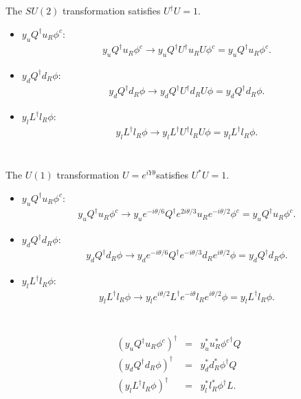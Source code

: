 \documentclass[11pt]{article}
\begin{document}
\section{ }
The $SU(2)$ transformation satisfies $U^\dagger U=1$.
\begin{itemize}
  \item $y_u Q^\dagger u_R \phi^c$:
  \begin{eqnarray}
    y_u Q^\dagger u_R \phi^c \to y_u Q^\dagger U^\dagger u_R U \phi^c = y_u Q^\dagger u_R \phi^c.
  \end{eqnarray}
  \item $y_d Q^\dagger d_R \phi$:
  \begin{eqnarray}
    y_d Q^\dagger d_R \phi \to y_d Q^\dagger U^\dagger d_R U \phi = y_d Q^\dagger d_R \phi.
  \end{eqnarray}
  \item $y_l L^\dagger l_R \phi$:
  \begin{eqnarray}
    y_l L^\dagger l_R \phi \to y_l L^\dagger U^\dagger l_R U \phi = y_l L^\dagger l_R \phi.
  \end{eqnarray}
\end{itemize}

\section{ }
The $U(1)$ transformation $U=e^{i Y \theta}$satisfies $U^* U=1$.
\begin{itemize}
  \item $y_u Q^\dagger u_R \phi^c$:
  \begin{eqnarray}
    y_u Q^\dagger u_R \phi^c \to y_u e^{-i \theta/6} Q^\dagger e^{2i \theta/3} u_R e^{-i \theta/2}\phi^c = y_u Q^\dagger u_R \phi^c.
  \end{eqnarray}
  \item $y_d Q^\dagger d_R \phi$:
  \begin{eqnarray}
    y_d Q^\dagger d_R \phi \to y_d e^{-i \theta/6} Q^\dagger e^{-i \theta/3} d_R e^{i \theta/2} \phi = y_d Q^\dagger d_R \phi.
  \end{eqnarray}
  \item $y_l L^\dagger l_R \phi$:
  \begin{eqnarray}
    y_l L^\dagger l_R \phi \to y_l e^{i \theta/2} L^\dagger e^{-i \theta} l_R e^{i \theta/2}\phi = y_l L^\dagger l_R \phi.
  \end{eqnarray}
\end{itemize}

\section{ }
\begin{eqnarray}
  (y_u Q^\dagger u_R \phi^c )^\dagger &=& y_u^*  u_R^* {\phi^c}^\dagger Q \\
  (y_d Q^\dagger d_R \phi )^\dagger &=& y_d^*  d_R^* {\phi}^\dagger Q \\
  (y_l L^\dagger l_R \phi )^\dagger &=& y_l^*  l_R^* {\phi}^\dagger L.
\end{eqnarray}
\end{document}

